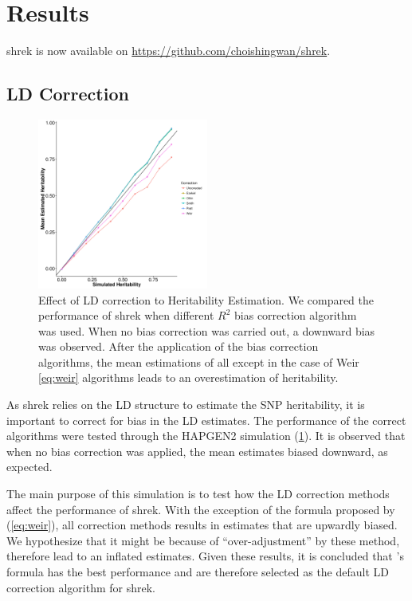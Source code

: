 \documentclass[12pt]{scrbook}
\begin{document}
\section{Results}
\gls{shrek} is now available on \url{https://github.com/choishingwan/shrek}.  
\subsection{LD Correction}
\begin{figure}
	\centering
	\includegraphics[width=0.5\textwidth]{figure/quantitative/ld_correct/LDCorrection_update.png}
	\caption[Effect of LD correction to Heritability Estimation]
	{Effect of LD correction to Heritability Estimation.
		We compared the performance of \gls{shrek} when different $R^2$ bias correction algorithm was used.
		When no bias correction was carried out, a downward bias was observed. 
		After the application of the bias correction algorithms, the mean estimations of all except in the case of Weir \cref{eq:weir} algorithms leads to an overestimation of heritability.
	} 
	\label{fig:meanLDCor}
\end{figure}
As \gls{shrek} relies on the \gls{LD} structure to estimate the \gls{SNP} heritability, it is important to correct for bias in the \gls{LD} estimates. 
The performance of the correct algorithms were tested through the HAPGEN2 simulation (\cref{fig:meanLDCor}).
It is observed that when no bias correction was applied, the mean estimates biased downward, as expected.

The main purpose of this simulation is to test how the \gls{LD} correction methods affect the performance of \gls{shrek}.
With the exception of the formula proposed by \citet{Weir1980} (\cref{eq:weir}), all correction methods results in estimates that are upwardly biased.
We hypothesize that it might be because of ``over-adjustment'' by these method, therefore lead to an inflated estimates.
Given these results, it is concluded that \citet{Weir1980}'s formula has the best performance and are therefore selected as the default \gls{LD} correction algorithm for \gls{shrek}.
\end{document}
